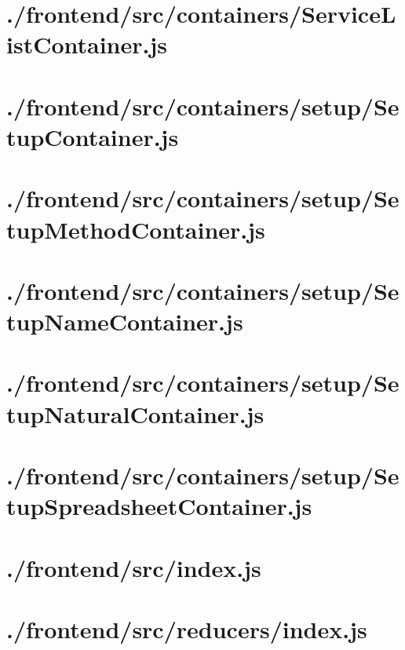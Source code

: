 \documentclass[11pt]{informatics-report}
\begin{document}
\newpage
\section{./frontend/src/containers/ServiceListContainer.js}


\newpage
\section{./frontend/src/containers/setup/SetupContainer.js}


\newpage
\section{./frontend/src/containers/setup/SetupMethodContainer.js}


\newpage
\section{./frontend/src/containers/setup/SetupNameContainer.js}


\newpage
\section{./frontend/src/containers/setup/SetupNaturalContainer.js}


\newpage
\section{./frontend/src/containers/setup/SetupSpreadsheetContainer.js}


\newpage
\section{./frontend/src/index.js}


\newpage
\section{./frontend/src/reducers/index.js}

\end{document}
